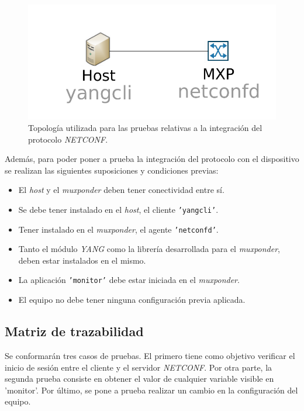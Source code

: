 \begin{figure}[!h]
	\centering
	\includegraphics[scale=0.8]{Figures/topologiatestnetconf.pdf}
	\caption{Topología utilizada para las pruebas relativas a la integración del protocolo \textit{NETCONF}.}
	\label{fig:test_topo_netconf}
  \end{figure}

  \newpage

Además, para poder poner a prueba la integración del protocolo con el dispositivo se realizan las siguientes suposiciones y condiciones previas:

\begin{itemize}
	\item El \textit{host} y el \textit{muxponder} deben tener conectividad entre sí.
    \item Se debe tener instalado en el \textit{host}, el cliente \texttt{'yangcli'}.
    \item Tener instalado en el \textit{muxponder}, el agente \texttt{'netconfd'}.
    \item Tanto el módulo \textit{YANG} como la librería desarrollada para el \textit{muxponder}, deben estar instalados en el mismo.
    \item La aplicación \texttt{'monitor'} debe estar iniciada en el \textit{muxponder}.
    \item El equipo no debe tener ninguna configuración previa aplicada.
\end{itemize}

\subsection{Matriz de trazabilidad}

Se conformarán tres casos de pruebas. El primero tiene como objetivo verificar el inicio de sesión entre el cliente y el servidor \textit{NETCONF}. Por otra parte, la segunda prueba consiste en obtener el valor de cualquier variable visible en 'monitor'. Por último, se pone a prueba realizar un cambio en la configuración del equipo.

